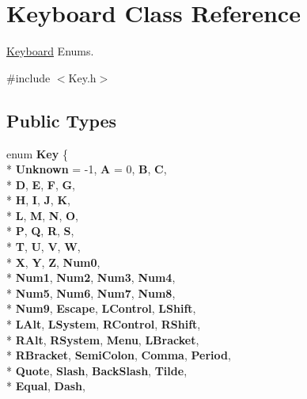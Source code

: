 \hypertarget{class_keyboard}{\section{Keyboard Class Reference}
\label{class_keyboard}
}


\hyperlink{class_keyboard}{Keyboard} Enums.  




{\ttfamily \#include $<$Key.\-h$>$}

\subsection*{Public Types}
\begin{DoxyCompactItemize}
\item 
enum {\bfseries Key} \{ \\*
{\bfseries Unknown} = -\/1, 
{\bfseries A} = 0, 
{\bfseries B}, 
{\bfseries C}, 
\\*
{\bfseries D}, 
{\bfseries E}, 
{\bfseries F}, 
{\bfseries G}, 
\\*
{\bfseries H}, 
{\bfseries I}, 
{\bfseries J}, 
{\bfseries K}, 
\\*
{\bfseries L}, 
{\bfseries M}, 
{\bfseries N}, 
{\bfseries O}, 
\\*
{\bfseries P}, 
{\bfseries Q}, 
{\bfseries R}, 
{\bfseries S}, 
\\*
{\bfseries T}, 
{\bfseries U}, 
{\bfseries V}, 
{\bfseries W}, 
\\*
{\bfseries X}, 
{\bfseries Y}, 
{\bfseries Z}, 
{\bfseries Num0}, 
\\*
{\bfseries Num1}, 
{\bfseries Num2}, 
{\bfseries Num3}, 
{\bfseries Num4}, 
\\*
{\bfseries Num5}, 
{\bfseries Num6}, 
{\bfseries Num7}, 
{\bfseries Num8}, 
\\*
{\bfseries Num9}, 
{\bfseries Escape}, 
{\bfseries L\-Control}, 
{\bfseries L\-Shift}, 
\\*
{\bfseries L\-Alt}, 
{\bfseries L\-System}, 
{\bfseries R\-Control}, 
{\bfseries R\-Shift}, 
\\*
{\bfseries R\-Alt}, 
{\bfseries R\-System}, 
{\bfseries Menu}, 
{\bfseries L\-Bracket}, 
\\*
{\bfseries R\-Bracket}, 
{\bfseries Semi\-Colon}, 
{\bfseries Comma}, 
{\bfseries Period}, 
\\*
{\bfseries Quote}, 
{\bfseries Slash}, 
{\bfseries Back\-Slash}, 
{\bfseries Tilde}, 
\\*
{\bfseries Equal}, 
{\bfseries Dash}, 

\end{DoxyCompactItemize}

